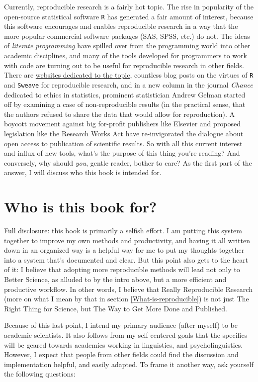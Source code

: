 \documentclass{book}
\begin{document}
Currently, reproducible research is a fairly hot topic. The rise in popularity of the open-source statistical software \texttt{R} has generated a fair amount of interest, because this software encourages and enables reproducible research in a way that the more popular commercial software packages (SAS, SPSS, etc.) do not. The ideas of \emph{literate programming} \parencite{knuth1984literate} have spilled over from the programming world into other academic disciplines, and many of the tools developed for programmers to work with code are turning out to be useful for reproducible research in other fields.  There are \href{http://reproducibleresearch.org/}{websites dedicated to the topic}, countless blog posts on the virtues of \texttt{R} and \texttt{Sweave} for reproducible research, and in a new column in the journal \emph{Chance} dedicated to ethics in statistics, prominent statistician Andrew Gelman started off by examining a case of non-reproducible results (in the practical sense, that the authors refused to share the data that would allow for reproduction). A boycott movement against big for-profit publishers like Elsevier and proposed legislation like the Research Works Act have re-invigorated the dialogue about open access to publication of scientific results. So with all this current interest and influx of new tools, what's the purpose of this thing you're reading?  And conversely, why should \emph{you}, gentle reader, bother to care?  As the first part of the answer, I will discuss who this book is intended for.
\section{Who is this book for?}
\label{sec-2-1}

Full disclosure: this book is primarily a selfish effort. I am putting this system together to improve my own methods and productivity, and having it all written down in an organized way is a helpful way for me to put my thoughts together into a system that's documented and clear. But this point also gets to the heart of it: I believe that adopting more reproducible methods will lead not only to Better Science, as alluded to by the intro above, but a more efficient and productive workflow. In other words, I believe that Really Reproducible Research (more on what I mean by that in section \ref{What-is-reproducible}) is not just The Right Thing for Science, but The Way to Get More Done and Published.

Because of this last point, I intend my primary audience (after myself) to be academic scientists. It also follows from my self-centered goals that the specifics will be geared towards academics working in linguistics, and psycholinguistics. However, I expect that people from other fields could find the discussion and implementation helpful, and easily adapted. To frame it another way, ask yourself the following questions:
\end{document}
